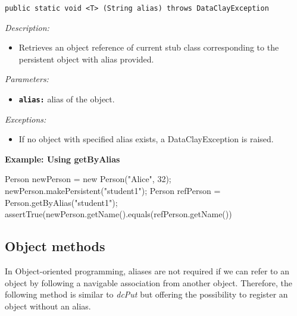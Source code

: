 
\begin{dBox}
\texttt{public static void <T>  (String alias) \newline throws DataClayException}
\LINE

{\it Description:}

\begin{itemize}
    \item Retrieves an object reference of current stub class corresponding to the persistent object with alias provided.
\end{itemize}

{\it Parameters:}

\begin{itemize}
    \item \texttt{\bfseries alias:} alias of the object.
\end{itemize}

{\it Exceptions:}

\begin{itemize}
    \item If no object with specified alias exists, a DataClayException is raised.
\end{itemize}

\end{dBox}

\begin{tBox}
\textcolor{basecolor} {\bf Example: Using getByAlias }
\begin{java}
Person newPerson = new Person("Alice", 32);
newPerson.makePersistent("student1");
Person refPerson = Person.getByAlias("student1");
assertTrue(newPerson.getName().equals(refPerson.getName())
\end{java}
\end{tBox}



\subsection{Object methods}

In Object-oriented programming, aliases are not required if we can refer to an object by following a navigable association from another object. Therefore, the following method is similar to \textit{dcPut} but offering the possibility to register an object without an alias.


